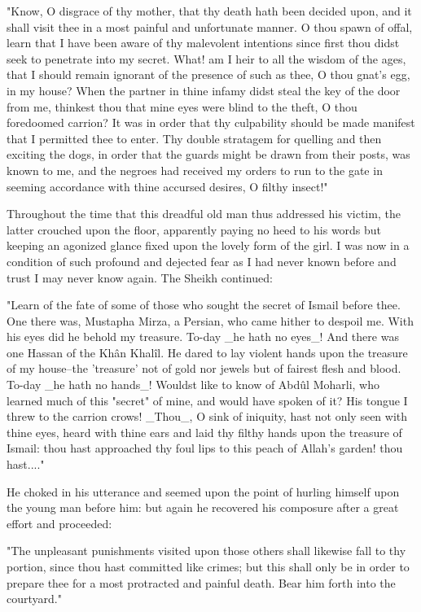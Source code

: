 "Know, O disgrace of thy mother, that thy death hath been decided
upon, and it shall visit thee in a most painful and unfortunate
manner. O thou spawn of offal, learn that I have been aware of thy
malevolent intentions since first thou didst seek to penetrate into my
secret. What! am I heir to all the wisdom of the ages, that I should
remain ignorant of the presence of such as thee, O thou gnat's egg, in
my house? When the partner in thine infamy didst steal the key of the
door from me, thinkest thou that mine eyes were blind to the theft, O
thou foredoomed carrion? It was in order that thy culpability should
be made manifest that I permitted thee to enter. Thy double stratagem
for quelling and then exciting the dogs, in order that the guards
might be drawn from their posts, was known to me, and the negroes had
received my orders to run to the gate in seeming accordance with
thine accursed desires, O filthy insect!"

Throughout the time that this dreadful old man thus addressed his
victim, the latter crouched upon the floor, apparently paying no heed
to his words but keeping an agonized glance fixed upon the lovely form
of the girl. I was now in a condition of such profound and dejected
fear as I had never known before and trust I may never know again. The
Sheikh continued:

"Learn of the fate of some of those who sought the secret of Ismail
before thee. One there was, Mustapha Mirza, a Persian, who came hither
to despoil me. With his eyes did he behold my treasure. To-day _he
hath no eyes_! And there was one Hassan of the Khân Khalîl. He dared
to lay violent hands upon the treasure of my house--the 'treasure' not
of gold nor jewels but of fairest flesh and blood. To-day _he hath no
hands_! Wouldst like to know of Abdûl Moharli, who learned much of
this "secret" of mine, and would have spoken of it? His tongue I threw
to the carrion crows! _Thou_, O sink of iniquity, hast not only seen
with thine eyes, heard with thine ears and laid thy filthy hands upon
the treasure of Ismail: thou hast approached thy foul lips to this
peach of Allah's garden! thou hast...."

He choked in his utterance and seemed upon the point of hurling
himself upon the young man before him: but again he recovered his
composure after a great effort and proceeded:

"The unpleasant punishments visited upon those others shall likewise
fall to thy portion, since thou hast committed like crimes; but this
shall only be in order to prepare thee for a most protracted and
painful death. Bear him forth into the courtyard."

